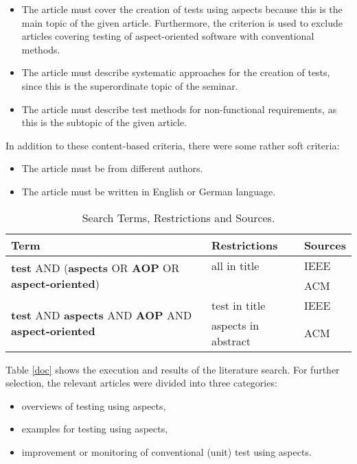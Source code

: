 \begin{itemize}
\item The article must cover the creation of tests using aspects because this is the main topic of the given article. Furthermore, the criterion is used to exclude articles covering testing of aspect-oriented software with conventional methods.
\item The article must describe systematic approaches for the creation of tests, since this is the superordinate topic of the seminar. 
\item The article must describe test methods for non-functional requirements, as this is the subtopic of the given article.
\end{itemize}

In addition to these content-based criteria, there were some rather soft criteria:
\begin{itemize}
\item The article must be from different authors.
\item The article must be written in English or German language.
\end{itemize}


\begin{table}[h]
\caption{Search Terms, Restrictions and Sources.}
	\begin{tabular}{p{6.5cm}|p{4.5cm}|p{2cm}}
	\hline
	\textbf{Term} & \textbf{Restrictions} & \textbf{Sources}\\
	\hline
	\multirow{2}{8cm}{\textbf{test} AND (\textbf{aspects} OR \textbf{AOP} OR \textbf{aspect-oriented})} & \tabitem all in title  &  \tabitem IEEE\\
	& \quad & \tabitem ACM \\
	\hline
	\multirow{2}{8cm}{\textbf{test} AND \textbf{aspects} AND \textbf{AOP} AND \textbf{aspect-oriented}} & \tabitem test in title  &  \tabitem IEEE\\
	& \tabitem aspects in abstract & \tabitem ACM \\
	\hline
	\end{tabular}
\label{restrict}
\end{table}


Table \autoref{doc} shows the execution and results of the literature search. For further selection, the relevant articles were divided into three categories:

\begin{itemize}
\item overviews of testing using aspects,
\item examples for testing using aspects,
\item improvement or monitoring of conventional (unit) test using aspects. 
\end{itemize}

